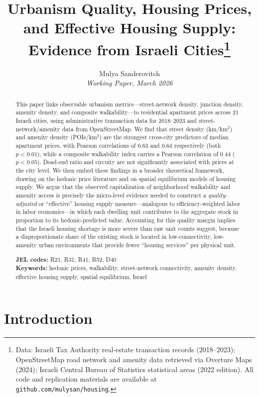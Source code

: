 \documentclass[12pt,a4paper]{article}
\title{\textbf{Urbanism Quality, Housing Prices, and Effective Housing Supply:\\
Evidence from Israeli Cities}\thanks{%
  Data: Israeli Tax Authority real-estate transaction records (2018--2023);
  OpenStreetMap road network and amenity data retrieved via Overture Maps (2024);
  Israeli Central Bureau of Statistics statistical areas (2022 edition).
  All code and replication materials are available at
  \texttt{github.com/mulysan/housing}.}}
\author{%
  Mulya Sanderovitch\\
  \small\textit{Working Paper, March 2026}
}
\date{}
\begin{document}
\maketitle
\thispagestyle{empty}

\begin{abstract}
\noindent
This paper links observable urbanism metrics—street-network density, junction
density, amenity density, and composite walkability—to residential apartment
prices across 21 Israeli cities, using administrative transaction data for
2018–2023 and street-network/amenity data from OpenStreetMap.  We find that
street density (km/km$^2$) and amenity density (POIs/km$^2$) are the strongest
cross-city predictors of median apartment prices, with Pearson correlations of
0.63 and 0.64 respectively (both $p < 0.01$), while a composite walkability
index carries a Pearson correlation of 0.44 ($p < 0.05$).  Dead-end ratio and
circuity are not significantly associated with prices at the city level.  We
then embed these findings in a broader theoretical framework, drawing on the
hedonic price literature and on spatial equilibrium models of housing supply.
We argue that the observed capitalization of neighborhood walkability and
amenity access is precisely the micro-level evidence needed to construct a
\textit{quality-adjusted} or ``effective'' housing supply measure—analogous to
efficiency-weighted labor in labor economics—in which each dwelling unit
contributes to the aggregate stock in proportion to its hedonic-predicted value.
Accounting for this quality margin implies that the Israeli housing shortage is
more severe than raw unit counts suggest, because a disproportionate share of
the existing stock is located in low-connectivity, low-amenity urban
environments that provide fewer ``housing services'' per physical unit.

\bigskip\noindent
\textbf{JEL codes:} R21, R31, R41, R52, D40\\
\textbf{Keywords:} hedonic prices, walkability, street-network connectivity,
amenity density, effective housing supply, spatial equilibrium, Israel
\end{abstract}

\newpage
\tableofcontents
\newpage

\section{Introduction}
\label{sec:intro}
\end{document}
